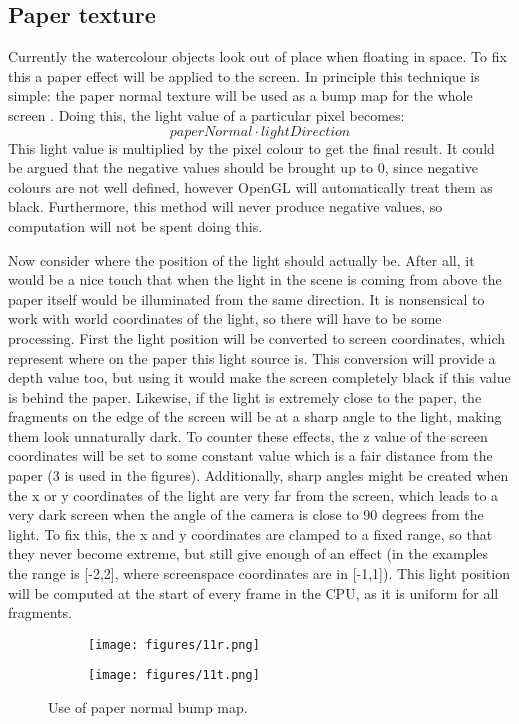 \documentclass[a4paper,10pt]{article}
\begin{document}
\subsection{Paper texture}
Currently the watercolour objects look out of place when floating in space. To fix this a paper effect will be applied to the screen. In principle this technique is simple: the paper normal texture will be used as a bump map for the whole screen \cite{Hoare2012}. Doing this, the light value of a particular pixel becomes:
$$\mathit{paperNormal} \cdot \mathit{lightDirection}$$
This light value is multiplied by the pixel colour to get the final result. It could be argued that the negative values should be brought up to 0, since negative colours are not well defined, however OpenGL will automatically treat them as black. Furthermore, this method will never produce negative values, so computation will not be spent doing this.

Now consider where the position of the light should actually be. After all, it would be a nice touch that when the light in the scene is coming from above the paper itself would be illuminated from the same direction. It is nonsensical to work with world coordinates of the light, so there will have to be some processing. First the light position will be converted to screen coordinates, which represent where on the paper this light source is. This conversion will provide a depth value too, but using it would make the screen completely black if this value is behind the paper. Likewise, if the light is extremely close to the paper, the fragments on the edge of the screen will be at a sharp angle to the light, making them look unnaturally dark. To counter these effects, the z value of the screen coordinates will be set to some constant value which is a fair distance from the paper (3 is used in the figures). Additionally, sharp angles might be created when the x or y coordinates of the light are very far from the screen, which leads to a very dark screen when the angle of the camera is close to 90 degrees from the light. To fix this, the x and y coordinates are clamped to a fixed range, so that they never become extreme, but still give enough of an effect (in the examples the range is [-2,2], where screenspace coordinates are in [-1,1]). This light position will be computed at the start of every frame in the CPU, as it is uniform for all fragments.

\begin{figure}[htbp!]
  \centering
  \begin{subfigure}{0.5\columnwidth}
    \texttt{[image: figures/11r.png]}
  \end{subfigure}
  \begin{subfigure}{0.3\columnwidth}
    \texttt{[image: figures/11t.png]}
  \end{subfigure}  \caption{Use of paper normal bump map.}
\end{figure}
\end{document}
